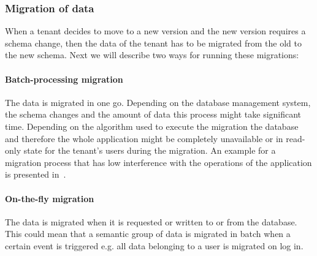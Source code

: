 \subsubsection{Migration of data}

When a tenant decides to move to a new version and the new version requires a schema change, then the data of the tenant has to be migrated from the old to the new schema. Next we will describe two ways for running these migrations:

\paragraph{Batch-processing migration} The data is migrated in one go. Depending on the database management system, the schema changes and the amount of data this process might take significant time. Depending on the algorithm used to execute the migration the database and therefore the whole application might be completely unavailable or in read-only state for the tenant's users during the migration. An example for a migration process that has low interference with the operations of the application is presented in~\cite{Keddo}.

\paragraph{On-the-fly migration} The data is migrated when it is requested or written to or from the database. This could mean that a semantic group of data is migrated in batch when a certain event is triggered e.g. all data belonging to a user is migrated on log in.

